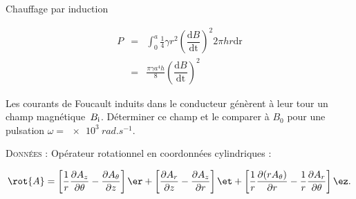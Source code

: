 \begin{exo}[PC][2][TD]{Chauffage par induction}
\begin{quest}
{ \begin{eqnarray*}
  P & = & \int_{0}^{a} \frac{1}{4} \gamma r^{2} \left(\dfrac{\mathrm{d} B}{\mathrm{d t}}\right)^{2} 2\pi h r \mathrm{dr} \\
    & = & \frac{\pi \gamma a^{4} h}{8} \left(\dfrac{\mathrm{d} B}{\mathrm{d t}}\right)^{2}
 \end{eqnarray*}
	}

	\item Les courants de Foucault induits dans le conducteur génèrent à leur tour un champ magnétique~$B_{\rm i}$. Déterminer ce champ et le comparer à $B_0$ pour une pulsation $\omega = \SI{e3}{rad.s^{-1}}$.



\end{quest}

\textsc{Données :} Opérateur rotationnel en coordonnées cylindriques :

 \begin{equation*}
  \rot{A} =  \left[\frac{1}{r} \frac{\partial A_{z}}{\partial \theta} - \frac{\partial A_{\theta}}{\partial z}\right]   \er +
				   \left[\frac{\partial A_{r}}{\partial z} - \frac{\partial A_{z}}{\partial r}\right]   \et +
				   \left[\frac{1}{r} \frac{\partial (rA_{\theta})}{\partial r} - \frac{1}{r} \frac{\partial A_{r}}{\partial \theta}\right] \ez.
 \end{equation*}

\end{exo}

